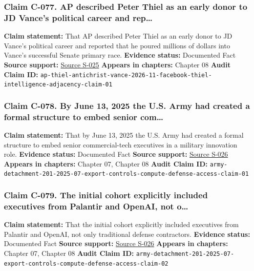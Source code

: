 \documentclass[
  american,
  11pt,
  letterpaper,
]{article}
\begin{document}
\subsubsection{Claim C-077. AP described Peter Thiel as an early donor
to JD Vance's political career and
rep\ldots{}}\label{claim-c-077-ap-described-peter-thiel-as-an-early-donor-to-jd-vance-s-political-career-and-rep}

\textbf{Claim statement:} That AP described Peter Thiel as an early
donor to JD Vance's political career and reported that he poured
millions of dollars into Vance's successful Senate primary race.
\textbf{Evidence status:} Documented Fact \textbf{Source support:}
\hyperref[source-s-025-thiel-brings-his-antichrist-lectures-to-the-vaticans-doorstep-and-catholic-institutions-back-away]{Source
S-025} \textbf{Appears in chapters:} Chapter 08 \textbf{Audit Claim ID:}
\texttt{ap-thiel-antichrist-vance-2026-11-facebook-thiel-intelligence-adjacency-claim-01}

\subsubsection{Claim C-078. By June 13, 2025 the U.S. Army had created a
formal structure to embed senior
com\ldots{}}\label{claim-c-078-by-june-13-2025-the-u-s-army-had-created-a-formal-structure-to-embed-senior-com}

\textbf{Claim statement:} That by June 13, 2025 the U.S. Army had
created a formal structure to embed senior commercial-tech executives in
a military innovation role. \textbf{Evidence status:} Documented Fact
\textbf{Source support:}
\hyperref[source-s-026-army-launches-detachment-201-executive-innovation-corps-to-drive-tech-transformation]{Source
S-026} \textbf{Appears in chapters:} Chapter 07, Chapter 08
\textbf{Audit Claim ID:}
\texttt{army-detachment-201-2025-07-export-controls-compute-defense-access-claim-01}

\subsubsection{Claim C-079. The initial cohort explicitly included
executives from Palantir and OpenAI, not
o\ldots{}}\label{claim-c-079-the-initial-cohort-explicitly-included-executives-from-palantir-and-openai-not-o}

\textbf{Claim statement:} That the initial cohort explicitly included
executives from Palantir and OpenAI, not only traditional defense
contractors. \textbf{Evidence status:} Documented Fact \textbf{Source
support:}
\hyperref[source-s-026-army-launches-detachment-201-executive-innovation-corps-to-drive-tech-transformation]{Source
S-026} \textbf{Appears in chapters:} Chapter 07, Chapter 08
\textbf{Audit Claim ID:}
\texttt{army-detachment-201-2025-07-export-controls-compute-defense-access-claim-02}
\end{document}
